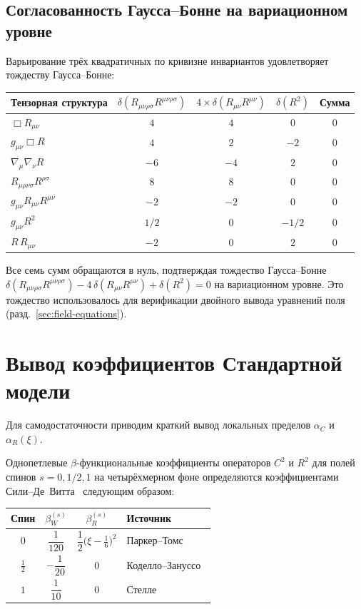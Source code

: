 \documentclass[12pt,a4paper]{article}
\newcommand{\Ricsq}{R_{\mu\nu}R^{\mu\nu}}
\newcommand{\Riemsq}{R_{\mu\nu\rho\sigma}R^{\mu\nu\rho\sigma}}
\theoremstyle{plain}
\theoremstyle{definition}
\begin{document}
\subsection{Согласованность Гаусса--Бонне на вариационном уровне}

Варьирование трёх квадратичных по кривизне инвариантов удовлетворяет
тождеству Гаусса--Бонне:

\begin{center}
\begin{tabular}{lcccc}
\toprule
Тензорная структура & $\delta(\Riemsq)$ & $4\times\delta(\Ricsq)$
  & $\delta(R^2)$ & Сумма \\
\midrule
$\Box R_{\mu\nu}$ & $4$ & $4$ & $0$ & $0$ \\
$g_{\mu\nu}\Box R$ & $4$ & $2$ & $-2$ & $0$ \\
$\nabla_\mu\nabla_\nu R$ & $-6$ & $-4$ & $2$ & $0$ \\
$R_{\mu\rho\nu\sigma}R^{\rho\sigma}$ & $8$ & $8$ & $0$ & $0$ \\
$g_{\mu\nu}\Ricsq$ & $-2$ & $-2$ & $0$ & $0$ \\
$g_{\mu\nu}R^2$ & $1/2$ & $0$ & $-1/2$ & $0$ \\
$R\,R_{\mu\nu}$ & $-2$ & $0$ & $2$ & $0$ \\
\bottomrule
\end{tabular}
\end{center}

\noindent
Все семь сумм обращаются в нуль, подтверждая тождество Гаусса--Бонне
$\delta(\Riemsq) - 4\,\delta(\Ricsq) + \delta(R^2) = 0$ на вариационном
уровне.  Это тождество использовалось для верификации двойного вывода
уравнений поля (разд.~\ref{sec:field-equations}).

\section{Вывод коэффициентов Стандартной модели}
\label{app:sm-coefficients}

Для самодостаточности приводим краткий вывод локальных пределов
$\alpha_C$ и $\alpha_R(\xi)$.

Однопетлевые $\beta$-функциональные коэффициенты операторов $C^2$ и $R^2$
для полей спинов $s = 0, 1/2, 1$ на четырёхмерном фоне определяются
коэффициентами Сили--Де~Витта~\cite{Vassilevich:2003xt,Parker:2009uva}
следующим образом:
\begin{center}
\begin{tabular}{cccl}
\toprule
Спин & $\beta_W^{(s)}$ & $\beta_R^{(s)}$ & Источник \\
\midrule
$0$ & $\dfrac{1}{120}$ & $\dfrac{1}{2}\bigl(\xi - \frac{1}{6}\bigr)^2$
  & Паркер--Томс~\cite{Parker:2009uva} \\[8pt]
$\frac{1}{2}$ & $-\dfrac{1}{20}$ & $0$
  & Коделло--Зануссо~\cite{Codello:2012kq} \\[8pt]
$1$ & $\dfrac{1}{10}$ & $0$
  & Стелле~\cite{Stelle:1976gc} \\
\bottomrule
\end{tabular}
\end{center}
\end{document}
